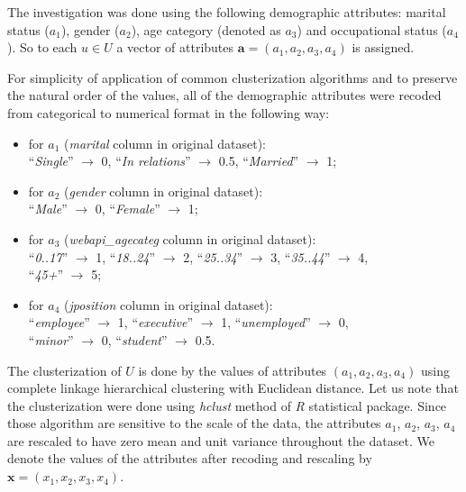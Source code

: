 \documentclass[runningheads,a4paper]{llncs}
\begin{document}
The investigation was done using the following demographic attributes: marital status ($a_1$), gender ($a_2$), age category (denoted as $a_3$) and occupational status ($a_4$). So to each $u \in U$ a vector of attributes $\boldsymbol{a} = (a_1, a_2, a_3, a_4)$ is assigned.

For simplicity of application of common clusterization algorithms and to preserve the natural order of the values, all of the demographic attributes were recoded from categorical to numerical format in the following way:


\begin{itemize}
\item for $a_1$ (\textit{marital} column in original dataset): \\ 
	``\textit{Single}''  $\to$ 0,  \qquad  ``\textit{In relations}''  $\to$ 0.5, \qquad  ``\textit{Married}''  $\to$ 1;
	\smallskip
	
\item for $a_2$ (\textit{gender} column in original dataset): \\ 
	``\textit{Male}''  $\to$ 0, \qquad  ``\textit{Female}'' $\to$ 1;
	\smallskip
	
\item for $a_3$ (\textit{webapi\_agecateg} column in original dataset): \\ 
	``\textit{0..17}''  $\to$ 1, \qquad  ``\textit{18..24}''  $\to$ 2, \qquad     ``\textit{25..34}''  $\to$ 3, \qquad  ``\textit{35..44}''  $\to$ 4, \\     ``\textit{45+}''  $\to$ 5;
	\smallskip
		
\item for $a_4$ (\textit{jposition} column in original dataset): \\ 
	``\textit{employee}'' $\to$ 1, \qquad  ``\textit{executive}'' $\to$ 1, \qquad  ``\textit{unemployed}'' $\to$ 0, \\  ``\textit{minor}'' $\to$ 0, \qquad  ``\textit{student}'' $\to$ 0.5.
\end{itemize}

The clusterization of $U$ is done by the values of attributes $(a_1, a_2, a_3, a_4)$ using complete linkage hierarchical clustering \cite{hclust} with Euclidean distance. Let us note that the clusterization were done using \textit{hclust} method of \textit{R} statistical package. Since those algorithm are sensitive to the scale of the data, the attributes $a_1$, $a_2$, $a_3$, $a_4$ are rescaled to have zero mean and unit variance throughout the dataset. We denote the values of the attributes after recoding and rescaling by $\boldsymbol{x} = (x_1, x_2, x_3, x_4)$.
\end{document}
